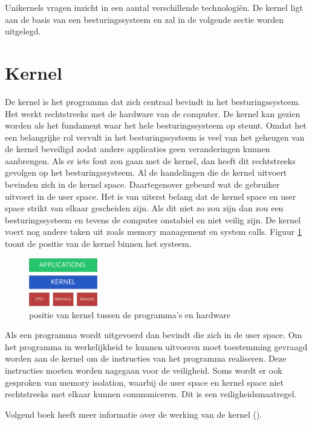 \documentclass[pdftex,a4paper,12pt,twoside]{report}
\begin{document}
Unikernels vragen inzicht in een aantal verschillende technologiën. De kernel ligt aan de basis van een besturingssysteem en zal in de volgende sectie worden uitgelegd.

\section{Kernel}

De kernel is het programma dat zich centraal bevindt in het besturingssysteem. Het werkt rechtstreeks met de hardware van de computer. De kernel kan gezien worden als het fundament waar het hele besturingssysteem op steunt. Omdat het een belangrijke rol vervult in het besturingssysteem is veel van het geheugen van de kernel beveiligd zodat andere applicaties geen veranderingen kunnen aanbrengen. Als er iets fout zou gaan met de kernel, dan heeft dit rechtstreeks gevolgen op het besturingssysteem. Al de handelingen die de kernel uitvoert bevinden zich in de kernel space. Daartegenover gebeurd wat de gebruiker uitvoert in de user space. Het is van uiterst belang dat de kernel space en user space strikt van elkaar gescheiden zijn. Als dit niet zo zou zijn dan zou een besturingssysteem en tevens de computer onstabiel en niet veilig zijn. De kernel voert nog andere taken uit zoals memory management en system calls. Figuur \ref{fig:kernel} toont de positie van de kernel binnen het systeem.

\begin{figure}
    \centering
    \includegraphics[width=3cm]{img/kernel}
    \caption{positie van kernel tussen de programma's en hardware}
    \label{fig:kernel}
\end{figure}

Als een programma wordt uitgevoerd dan bevindt die zich in de user space. Om het programma in werkelijkheid te kunnen uitvoeren moet toestemming gevraagd worden aan de kernel om de instructies van het programma realiseren. Deze instructies moeten worden nagegaan voor de veiligheid. Soms wordt er ook gesproken van memory isolation, waarbij de user space en kernel space niet rechtstreeks met elkaar kunnen communiceren. Dit is een veiligheidsmaatregel.

Volgend boek heeft meer informatie over de werking van de kernel (\cite{bovet_understanding_2005}).
\end{document}
